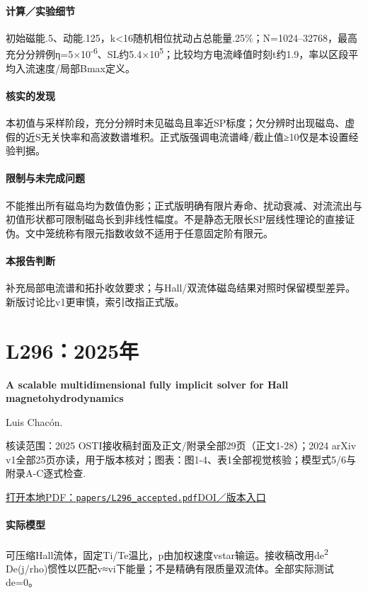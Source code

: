 \paragraph{计算／实验细节}初始磁能.5、动能.125，k<16随机相位扰动占总能量.25\%；N=1024–32768，最高充分分辨例η=5×10\textsuperscript{-6}、SL约5.4×10\textsuperscript{5}；比较均方电流峰值时刻t约1.9，率以区段平均入流速度/局部Bmax定义。

\paragraph{核实的发现}本初值与采样阶段，充分分辨时未见磁岛且率近SP标度；欠分辨时出现磁岛、虚假的近S无关快率和高波数谱堆积。正式版强调电流谱峰/截止值≥10仅是本设置经验判据。

\paragraph{限制与未完成问题}不能推出所有磁岛均为数值伪影；正式版明确有限片寿命、扰动衰减、对流流出与初值形状都可限制磁岛长到非线性幅度。不是静态无限长SP层线性理论的直接证伪。文中笼统称有限元指数收敛不适用于任意固定阶有限元。

\paragraph{本报告判断}补充局部电流谱和拓扑收敛要求；与Hall/双流体磁岛结果对照时保留模型差异。新版讨论比v1更审慎，索引改指正式版。

\section{L296：2025年}\label{paper:L296}

\textbf{A scalable multidimensional fully implicit solver for Hall magnetohydrodynamics}\citep{L296}\

Luis Chacón.

\textsf{核读范围：}2025 OSTI接收稿封面及正文/附录全部29页（正文1-28）；2024 arXiv v1全部25页亦读，用于版本核对；\textsf{图表：}图1-4、表1全部视觉核验；模型式5/6与附录A-C逐式检查.

\href{run:papers/L296_accepted.pdf}{打开本地PDF：\texttt{papers/L296\_accepted.pdf}}\quad\href{https://doi.org/10.1016/j.jcp.2025.113789}{DOI／版本入口}

\paragraph{实际模型}可压缩Hall流体，固定Ti/Te温比，p由加权速度vstar输运。接收稿改用de\textsuperscript{2} De(j/rho)惯性以匹配v≈vi下能量；不是精确有限质量双流体。全部实际测试de=0。

